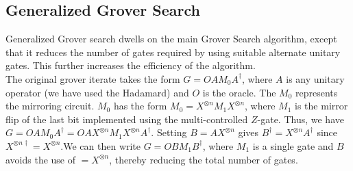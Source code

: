 \subsection{Generalized Grover Search}
Generalized Grover search\cite{gengrov} dwells on the main Grover Search algorithm, except that it reduces the number of gates required by using suitable alternate unitary gates. This further increases the efficiency of the algorithm.\\
The original grover iterate takes the form $G=OAM_0A^\dagger$, where $A$ is any unitary operator (we have used the Hadamard) and $O$ is the oracle. The $M_0$ represents the mirroring circuit. $M_0$ has the form $M_0=X^{\otimes n}M_1X^{\otimes n}$, where $M_1$ is the mirror flip of the last bit implemented using the multi-controlled $Z$-gate. Thus, we have $G=OAM_0A^\dagger=OAX^{\otimes n}M_1X^{\otimes n} A^\dagger$. Setting $B=AX^{\otimes n}$ gives $B^\dagger=X^{\otimes n} A^\dagger$ since $X^{\otimes n\dagger}=X^{\otimes n}$.We can then write $G=OBM_1B^\dagger$, where $M_1$ is a single gate and $B$ avoids the use of $=X^{\otimes n}$, thereby reducing the total number of gates.